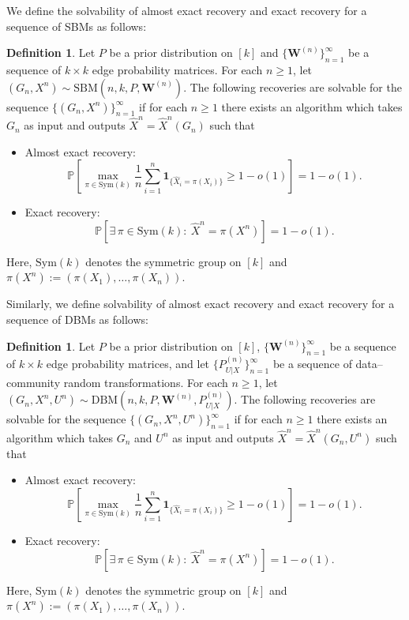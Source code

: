 \documentclass[11pt]{article}
\theoremstyle{plain}
\theoremstyle{definition}
\newtheorem{definition}[theorem]{Definition}
\newcommand{\one}[1]{\mathbf{1}_{\{#1\}}}
\begin{document}
We define the solvability of almost exact recovery and exact recovery for a sequence of SBMs as follows:

\begin{definition}
	Let $P$ be a prior distribution on $[k]$ and $\{\mathbf{W}^{(n)}\}_{n=1}^{\infty}$ be a sequence of $k\times k$ edge probability matrices. For each $n\geq 1$, let $(G_n, X^n)\sim \mathrm{SBM}(n,k,P,\mathbf{W}^{(n)})$. The following recoveries are solvable for the sequence $\{(G_n, X^n)\}_{n=1}^{\infty}$ if for each $n\geq 1$ there exists an algorithm which takes $G_n$ as input and outputs $\hat{X}^n=\hat{X}^n(G_n)$ such that
	\begin{itemize}
		\item Almost exact recovery: 
		\[
		\mathbb{P}\left[\max_{\pi\in \text{Sym}(k)}\frac{1}{n}\sum_{i=1}^n \one{\hat{X}_i=\pi(X_i)} \ge 1-o(1)\right]=1-o(1).
		\]
		\item Exact recovery:  
		\[
		\mathbb{P}\left[\exists\,\pi\in \text{Sym}(k):\ \hat{X}^n=\pi(X^n)\right]=1-o(1).
		\]
	\end{itemize}
	Here, $\text{Sym}(k)$ denotes the symmetric group on $[k]$ and $\pi(X^n):=(\pi(X_1),\dots,\pi(X_n))$.
\end{definition}

Similarly, we define solvability of almost exact recovery and exact recovery for a sequence of DBMs as follows:

\begin{definition}\label{def:ER_almostER}
	Let $P$ be a prior distribution on $[k]$, $\{\mathbf{W}^{(n)}\}_{n=1}^{\infty}$ be a sequence of $k\times k$ edge probability matrices, and let $\{P^{(n)}_{U|X}\}_{n=1}^{\infty}$ be a sequence of data--community random transformations. For each $n\geq 1$, let $(G_n, X^n, U^n)\sim \mathrm{DBM}(n,k,P,\mathbf{W}^{(n)}, P^{(n)}_{U|X})$. The following recoveries are solvable for the sequence $\{(G_n, X^n, U^n)\}_{n=1}^{\infty}$ if for each $n\geq 1$ there exists an algorithm which takes $G_n$ and $U^n$ as input and outputs $\hat{X}^n=\hat{X}^n(G_n, U^n)$ such that
	\begin{itemize}
		\item Almost exact recovery: 
		\[
		\mathbb{P}\left[\max_{\pi\in \text{Sym}(k)}\frac{1}{n}\sum_{i=1}^n \one{\hat{X}_i=\pi(X_i)} \ge 1-o(1)\right]=1-o(1).
		\]
		\item Exact recovery:  
		\[
		\mathbb{P}\left[\exists\,\pi\in \text{Sym}(k):\ \hat{X}^n=\pi(X^n)\right]=1-o(1).
		\]
	\end{itemize}
	Here, $\text{Sym}(k)$ denotes the symmetric group on $[k]$ and $\pi(X^n):=(\pi(X_1),\dots,\pi(X_n))$.
\end{definition}
\end{document}

